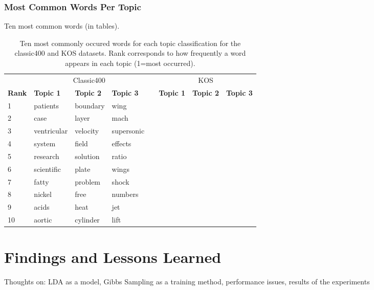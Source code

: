 \documentclass[10pt]{article}
\newcommand{\ra}[1]{\renewcommand{\arraystretch}{#1}}
\begin{document}
\subsubsection{Most Common Words Per Topic}
Ten most common words (in tables).

\begin{table}
	\centering
    \ra{1.2}
	\begin{tabular}{@{} l l l l c l l l @{}}
        \toprule
        & \multicolumn{3}{c}{Classic400} & \phantom{abc} & \multicolumn{3}{c}{KOS}\\
        \cmidrule{2-4} \cmidrule{6-8}
        \bf{Rank} & \bf{Topic 1} & \bf{Topic 2} & \bf{Topic 3} && \bf{Topic 1} & \bf{Topic 2} & \bf{Topic 3} \\
        \midrule
         1 & patients     & boundary     & wing         && & & \\
         2 & case         & layer        & mach         && & & \\
         3 & ventricular  & velocity     & supersonic   && & & \\
         4 & system       & field        & effects      && & & \\
         5 & research     & solution     & ratio        && & & \\
         6 & scientific   & plate        & wings        && & & \\
         7 & fatty        & problem      & shock        && & & \\
         8 & nickel       & free         & numbers      && & & \\
         9 & acids        & heat         & jet          && & & \\
        10 & aortic       & cylinder     & lift         && & & \\
        \bottomrule
	\end{tabular}
	\caption{Ten most commonly occured words for each topic classification for the classic400 and KOS datasets. Rank corresponds to how frequently a word appears in each topic (1=most occurred).}
	\label{tab:common_classic400}
\end{table}



\section{Findings and Lessons Learned}
\label{sec:conclusion}

Thoughts on: LDA as a model, Gibbs Sampling as a training method, performance issues, results of the experiments




\end{document}
